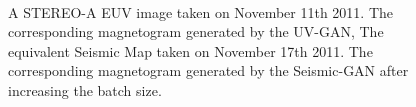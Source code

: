 \documentclass[11pt,a4paper,onecolumn]{report}
\begin{document}
\begin{figure}[t]%
  \centering
  \\
  \caption[]{ A STEREO-A EUV image taken on November
  11th 2011.  The corresponding magnetogram generated
  by the UV-GAN,  The equivalent Seismic Map taken
  on November 17th 2011.  The corresponding
  magnetogram generated by the Seismic-GAN after increasing the batch size.}
  \label{fig:batch}
\end{figure}
\end{document}
